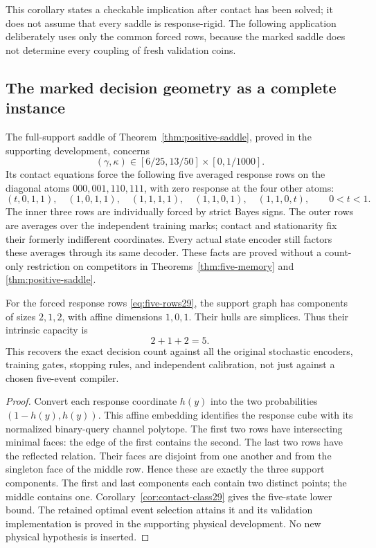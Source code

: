This corollary states a checkable implication after contact has been
solved; it does not assume that every saddle is response-rigid. The
following application deliberately uses only the common forced rows,
because the marked saddle does not determine every coupling of fresh
validation coins.

\subsection{The marked decision geometry as a complete instance}
The full-support saddle of Theorem~\ref{thm:positive-saddle}, proved
in the supporting development, concerns
\[
 (\gamma,\kappa)\in[6/25,13/50]\times[0,1/1000].
\]
Its contact equations force the following five averaged response rows
on the diagonal atoms $000,001,110,111$, with zero response at the four
other atoms:
\begin{equation}\label{eq:five-rows29}
 (t,0,1,1),\quad(1,0,1,1),\quad(1,1,1,1),\quad
 (1,1,0,1),\quad(1,1,0,t),\qquad 0<t<1.
\end{equation}
The inner three rows are individually forced by strict Bayes signs.
The outer rows are averages over the independent training marks;
contact and stationarity fix their formerly indifferent coordinates.
Every actual state encoder still factors these averages through its
same decoder. These facts are proved without a count-only restriction
on competitors in Theorems~\ref{thm:five-memory} and
\ref{thm:positive-saddle}.

\begin{proposition}
\label{prop:marked-csr29}
For the forced response rows \eqref{eq:five-rows29}, the support graph
has components of sizes $2,1,2$, with affine dimensions $1,0,1$.
Their hulls are simplices. Thus their intrinsic capacity is
\begin{equation}\label{eq:five-rank29}
                            2+1+2=5.
\end{equation}
This recovers the exact decision count against all the original
stochastic encoders, training gates, stopping rules, and independent
calibration, not just against a chosen five-event compiler.
\end{proposition}
\begin{proof}
Convert each response coordinate $h(y)$ into the two probabilities
$(1-h(y),h(y))$. This affine embedding identifies the response cube
with its normalized binary-query channel polytope. The first two rows
have intersecting minimal faces: the edge of the first contains the
second. The last two rows have the reflected relation. Their faces
are disjoint from one another and from the singleton face of the
middle row. Hence these are exactly the three support components.
The first and last components each contain two distinct points;
the middle contains one. Corollary~\ref{cor:contact-class29} gives the
five-state lower bound. The retained optimal event selection attains
it and its validation implementation is proved in the supporting
physical development. No new physical hypothesis is inserted.
\end{proof}

